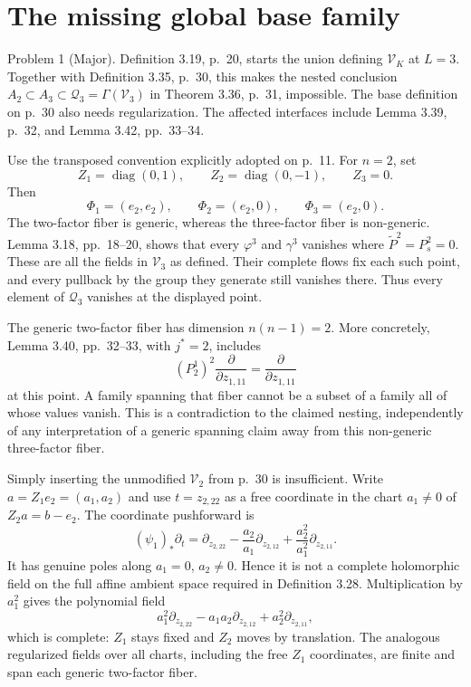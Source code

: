 \documentclass[10pt]{article}
\begin{document}
\section*{The missing global base family}
Problem 1 (Major).  Definition 3.19, p. 20, starts the union defining \(\mathcal V_K\) at \(L=3\). Together with Definition 3.35, p. 30, this makes the nested conclusion \(A_2\subset A_3\subset\mathcal Q_3=\Gamma(\mathcal V_3)\) in Theorem 3.36, p. 31, impossible. The base definition on p. 30 also needs regularization. The affected interfaces include Lemma 3.39, p. 32, and Lemma 3.42, pp. 33–34.\par
Use the transposed convention explicitly adopted on p. 11. For \(n=2\), set \[Z_1=\operatorname{diag}(0,1),\qquad Z_2=\operatorname{diag}(0,-1),\qquad Z_3=0.\] Then \[\Phi_1=(e_2,e_2),\qquad
 \Phi_2=(e_2,0),\qquad \Phi_3=(e_2,0).\] The two-factor fiber is generic, whereas the three-factor fiber is non-generic. Lemma 3.18, pp. 18–20, shows that every \(\varphi^3\) and \(\gamma^3\) vanishes where \(\widetilde P^2=P_s^2=0\). These are all the fields in \(\mathcal V_3\) as defined. Their complete flows fix each such point, and every pullback by the group they generate still vanishes there. Thus every element of \(\mathcal Q_3\) vanishes at the displayed point.\par
The generic two-factor fiber has dimension \(n(n-1)=2\). More concretely, Lemma 3.40, pp. 32–33, with \(j^*=2\), includes \[(P^1_2)^2\frac{\partial}{\partial z_{1,11}}
 =\frac{\partial}{\partial z_{1,11}}\] at this point. A family spanning that fiber cannot be a subset of a family all of whose values vanish. This is a contradiction to the claimed nesting, independently of any interpretation of a generic spanning claim away from this non-generic three-factor fiber.\par
Simply inserting the unmodified \(\mathcal V_2\) from p. 30 is insufficient. Write \(a=Z_1e_2=(a_1,a_2)\) and use \(t=z_{2,22}\) as a free coordinate in the chart \(a_1\ne0\) of \(Z_2a=b-e_2\). The coordinate pushforward is \[(\psi_1)_*\partial_t
 =\partial_{z_{2,22}}-\frac{a_2}{a_1}\partial_{z_{2,12}}
   +\frac{a_2^2}{a_1^2}\partial_{z_{2,11}}.                 \tag{1}\] It has genuine poles along \(a_1=0\), \(a_2\ne0\). Hence it is not a complete holomorphic field on the full affine ambient space required in Definition 3.28. Multiplication by \(a_1^2\) gives the polynomial field \[a_1^2\partial_{z_{2,22}}-a_1a_2\partial_{z_{2,12}}
       +a_2^2\partial_{z_{2,11}},                         \tag{2}\] which is complete: \(Z_1\) stays fixed and \(Z_2\) moves by translation. The analogous regularized fields over all charts, including the free \(Z_1\) coordinates, are finite and span each generic two-factor fiber.\par
\end{document}
